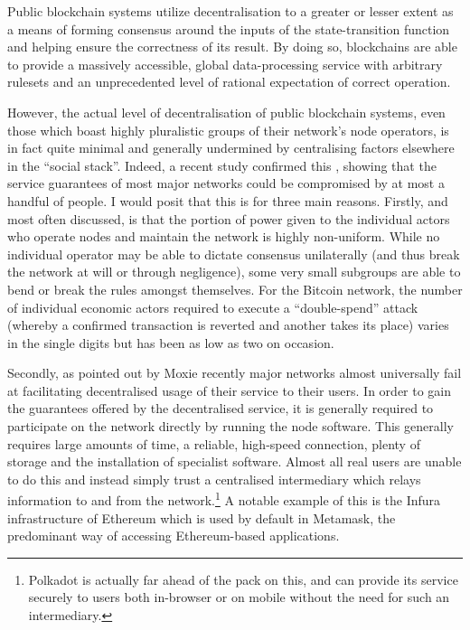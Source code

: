 \documentclass[9pt,oneside]{amsart}
\begin{document}
Public blockchain systems utilize decentralisation to a greater or lesser extent as a means of forming consensus around the inputs of the state-transition function and helping ensure the correctness of its result. By doing so, blockchains are able to provide a massively accessible, global data-processing service with arbitrary rulesets and an unprecedented level of rational expectation of correct operation.

However, the actual level of decentralisation of public blockchain systems, even those which boast highly pluralistic groups of their network's node operators, is in fact quite minimal and generally undermined by centralising factors elsewhere in the ``social stack''. Indeed, a recent study confirmed this \cite{TODO}, showing that the service guarantees of most major networks could be compromised by at most a handful of people. I would posit that this is for three main reasons. Firstly, and most often discussed, is that the portion of power given to the individual actors who operate nodes and maintain the network is highly non-uniform. While no individual operator may be able to dictate consensus unilaterally (and thus break the network at will or through negligence), some very small subgroups are able to bend or break the rules amongst themselves. For the Bitcoin network, the number of individual economic actors required to execute a ``double-spend'' attack (whereby a confirmed transaction is reverted and another takes its place) varies in the single digits but has been as low as two on occasion.

Secondly, as pointed out by Moxie recently \cite{TODO} major networks almost universally fail at facilitating decentralised usage of their service to their users. In order to gain the guarantees offered by the decentralised service, it is generally required to participate on the network directly by running the node software. This generally requires large amounts of time, a reliable, high-speed connection, plenty of storage and the installation of specialist software. Almost all real users are unable to do this and instead simply trust a centralised intermediary which relays information to and from the network.\footnote{Polkadot is actually far ahead of the pack on this, and can provide its service securely to users both in-browser or on mobile without the need for such an intermediary.} A notable example of this is the Infura infrastructure of Ethereum which is used by default in Metamask, the predominant way of accessing Ethereum-based applications.
\end{document}
